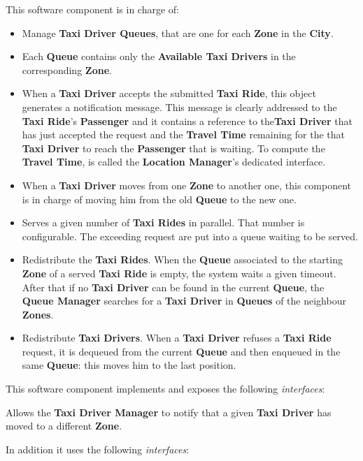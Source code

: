 \begin{itemize}
\begin{itemize}
		 This software component is in charge of:
		\begin{itemize}
			\item Manage \textbf{Taxi Driver Queues}, that are one for each \textbf{Zone} in the \textbf{City}.
			\item Each \textbf{Queue} contains only the \textbf{Available Taxi Drivers} in the corresponding \textbf{Zone}.
			\item When a \textbf{Taxi Driver} accepts the submitted \textbf{Taxi Ride}, this object generates a notification message. This message is clearly addressed to the \textbf{Taxi Ride}'s \textbf{Passenger} and it contains a reference to the\textbf{Taxi Driver} that has just accepted the request and the \textbf{Travel Time} remaining for the that \textbf{Taxi Driver} to reach the \textbf{Passenger} that is waiting.
			To compute the \textbf{Travel Time}, is called the \textbf{Location Manager}'s dedicated interface.
			\item When a \textbf{Taxi Driver} moves from one \textbf{Zone} to another one, this component is in charge of moving him from the old \textbf{Queue} to the new one.
			\item Serves a given number of \textbf{Taxi Rides} in parallel. That number is configurable. The exceeding request are put into a queue waiting to be served.
			\item Redistribute the \textbf{Taxi Rides}. When the \textbf{Queue} associated to the starting \textbf{Zone} of a served \textbf{Taxi Ride} is empty, the system waits a given timeout. After that if no \textbf{Taxi Driver} can be found in the current \textbf{Queue}, the \textbf{Queue Manager} searches for a \textbf{Taxi Driver} in \textbf{Queues} of the neighbour \textbf{Zones}.
			\item Redistribute \textbf{Taxi Drivers}. When a \textbf{Taxi Driver} refuses a \textbf{Taxi Ride} request, it is dequeued from the current \textbf{Queue} and then enqueued in the same \textbf{Queue}: this moves him to the last position.
		\end{itemize}
		This software component implements and exposes the following \textit{interfaces}:
		\begin{itemize}
			 Allows the \textbf{Taxi Driver Manager} to notify that a given \textbf{Taxi Driver} has moved to a different \textbf{Zone}.
		\end{itemize}
		In addition it uses the following \textit{interfaces}:
		\begin{itemize}

\end{itemize}
\end{itemize}
\end{itemize}
